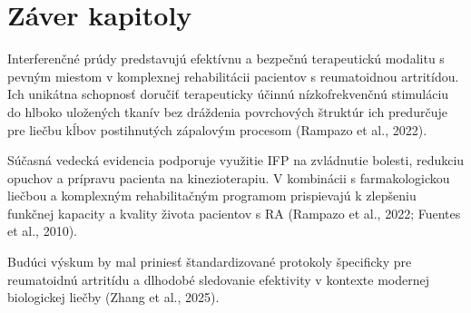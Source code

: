 \section{Záver kapitoly}

Interferenčné prúdy predstavujú efektívnu a bezpečnú terapeutickú modalitu s pevným miestom v komplexnej rehabilitácii pacientov s reumatoidnou artritídou. Ich unikátna schopnosť doručiť terapeuticky účinnú nízkofrekvenčnú stimuláciu do hlboko uložených tkanív bez dráždenia povrchových štruktúr ich predurčuje pre liečbu kĺbov postihnutých zápalovým procesom (Rampazo et al., 2022). 

Súčasná vedecká evidencia podporuje využitie IFP na zvládnutie bolesti, redukciu opuchov a prípravu pacienta na kinezioterapiu. V kombinácii s farmakologickou liečbou a komplexným rehabilitačným programom prispievajú k zlepšeniu funkčnej kapacity a kvality života pacientov s RA (Rampazo et al., 2022; Fuentes et al., 2010). 

Budúci výskum by mal priniesť štandardizované protokoly špecificky pre reumatoidnú artritídu a dlhodobé sledovanie efektivity v kontexte modernej biologickej liečby (Zhang et al., 2025).